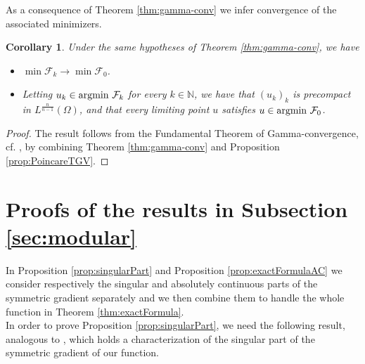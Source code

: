 \documentclass[a4paper,11pt,oneside,notitlepage]{article}
\newtheorem{corollary}[theorem]{Corollary}
\numberwithin{equation}{section}
\def\N{\mathbb{N}}
\begin{document}
As a consequence of Theorem \ref{thm:gamma-conv} we infer convergence of the associated minimizers.

\begin{corollary}
    Under the same hypotheses of Theorem \ref{thm:gamma-conv}, we have
    \begin{itemize}
        \item[(i)] $\min \mathcal{F}_k \to \min \mathcal{F}_0$.
        
        \item[(ii)] Letting $u_k \in \textnormal{argmin }\mathcal{F}_k$ for every $k \in \N$, we have that $(u_k)_k$ is precompact in $L^{\frac{n}{n-1}}(\Omega)$, and that every limiting point $u$ satisfies $u \in \textnormal{argmin }\mathcal{F}_0$.
    \end{itemize}
\end{corollary}
\begin{proof}
    The result follows from the Fundamental Theorem of Gamma-convergence, cf. \cite{B}, by combining Theorem \ref{thm:gamma-conv} and Proposition \ref{prop:PoincareTGV}.
\end{proof}


\appendix

\section{Proofs of the results in Subsection \ref{sec:modular}}
\label{app:proof_mod}

In Proposition \ref{prop:singularPart} and Proposition \ref{prop:exactFormulaAC} we consider respectively the singular and absolutely continuous parts of the symmetric gradient separately and we then combine them to handle the whole function in Theorem \ref{thm:exactFormula}.
\\
In order to prove Proposition \ref{prop:singularPart}, we need the following result, analogous to \cite[Lemma 3.5]{EHH}, which holds a characterization of the singular part of the symmetric gradient of our function.
\end{document}
